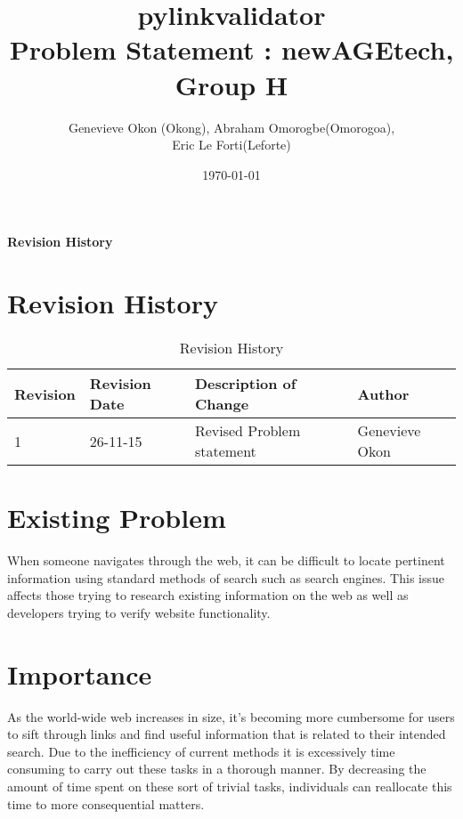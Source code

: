 \documentclass[12pt]{article}
\begin{document}
\title{pylinkvalidator \\
 Problem Statement : newAGEtech, Group H }
\author{Genevieve Okon (Okong), Abraham Omorogbe(Omorogoa),\\
 Eric Le Forti(Leforte)}
\date{\today}
\maketitle

\tableofcontents
\listoffigures
\listoftables

\textbf{Revision History} \\ \normalsize
\pagebreak

\section{Revision History}
\begin{table}[h!]
	\begin{tabular}{| p{5cm} | p{5cm} | p{5cm} |p{5cm} |}    \hline
Revision  &Revision Date &Description of Change &Author\\ \hline
1& 26-11-15& Revised Problem statement&Genevieve Okon\\ \hline
       \end{tabular}
       
       \caption{Revision History}
       \label{table:Revision History}
\end{table}



	
\section{Existing Problem}

When someone navigates through the web, it can be difficult to locate pertinent information using standard methods of search such as search engines. This issue affects those trying to research existing information on the web as well as developers trying to verify website functionality.\newline

\section{Importance}

As the world-wide web increases in size, it's becoming more cumbersome for users to sift through links and find useful information that is related to their intended search. Due to the inefficiency of current methods it is excessively time consuming to carry out these tasks in a thorough manner. By decreasing the amount of time spent on these sort of trivial tasks, individuals can reallocate this time to more consequential matters. \newline
\end{document}
